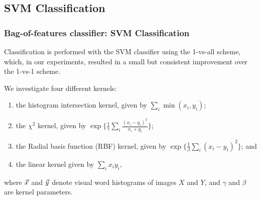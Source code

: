 \documentclass{beamer}
\def\v#1{\protect\vec #1}
\begin{document}
\subsection{SVM Classification}
\begin{frame}
\frametitle{Bag-of-features classifier: SVM Classification}

Classification is performed with
the SVM classifier using the 1-vs-all scheme, which, in our experiments, resulted in a small but consistent improvement
over the 1-vs-1 scheme. 
 
We investigate four different kernels: 
\begin{enumerate}
\item the histogram intersection kernel, given by $\sum_i \min(x_i,y_i)$;
\item the $\chi^2$ kernel, given by $\exp\{\frac{1}{\gamma} \sum_i \frac{(x_i-y_i)^2}{x_i+y_i}\}$; 
\item  the Radial basis function (RBF) kernel, given by  $\exp\{\frac{1}{\beta} \sum_i (x_i-y_i)^2\}$; and
\item the linear kernel given by $\sum_i x_i y_i$,
\end{enumerate}

where $\v x$ and $\v y$ denote visual word histograms of images $X$ and $Y$, and $\gamma$ and $\beta$ are
kernel parameters.

\end{frame}


\end{document}
